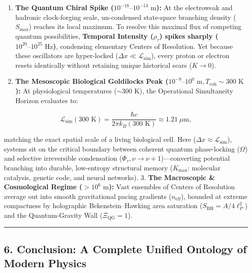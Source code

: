 \documentclass[
]{article}
\providecommand{\tightlist}{%
  \setlength{\itemsep}{0pt}\setlength{\parskip}{0pt}}
\begin{document}
\begin{enumerate}
\def\labelenumi{\arabic{enumi}.}
\tightlist
\item
  \textbf{The Quantum Chiral Spike
  (\(10^{-18}\text{–}10^{-13}\text{ m}\)):} At the electroweak and
  hadronic clock-forging scale, un-condensed state-space branching
  density (\(S_{\text{max}}\)) reaches its local maximum. To resolve
  this maximal flux of competing quantum possibilities, \textbf{Temporal
  Intensity (\(\rho_\tau\)) spikes sharply
  (\(10^{20}\text{–}10^{25}\text{ Hz}\))}, condensing elementary Centers
  of Resolution. Yet because these oscillators are hyper-locked
  (\(\Delta x \ll \mathcal{L}_{\text{sim}}\)), every proton or electron
  resets identically without retaining unique historical scars
  (\(K \to 0\)).
\item
  \textbf{The Mesoscopic Biological Goldilocks Peak
  (\(10^{-9}\text{–}10^{0}\text{ m}, T_{\text{coh}} \sim 300\text{ K}\)):}
  At physiological temperatures (\(\sim 300\text{ K}\)), the Operational
  Simultaneity Horizon evaluates to:
\end{enumerate}

\[\mathcal{L}_{\text{sim}}(300\text{ K}) = \frac{\hbar c}{2\pi k_B (300\text{ K})} \approx 1.21\ \mu\text{m},\]

matching the exact spatial scale of a living biological cell. Here
(\(\Delta x \approx \mathcal{L}_{\text{sim}}\)), systems sit on the
critical boundary between coherent quantum phase-locking (\(\Omega\))
and selective irreversible condensation
(\(\Phi_\tau, \nu \to \nu + 1\))---converting potential branching into
durable, low-entropy structural memory (\(K_{\text{max}}\): molecular
catalysis, genetic code, and neural networks). 3. \textbf{The
Macroscopic \& Cosmological Regime (\(> 10^{6}\text{ m}\)):} Vast
ensembles of Centers of Resolution average out into smooth gravitational
pacing gradients (\(n_{\text{eff}}\)), bounded at extreme compactness by
holographic Bekenstein--Hawking area saturation
(\(S_{\text{BH}} = A / 4\ell_P^2\)) and the Quantum-Gravity Wall
(\(\Xi_{\text{QG}} = 1\)).

\begin{center}\rule{0.5\linewidth}{0.5pt}\end{center}

\subsection{6. Conclusion: A Complete Unified Ontology of Modern
Physics}\label{conclusion-a-complete-unified-ontology-of-modern-physics}
\end{document}
